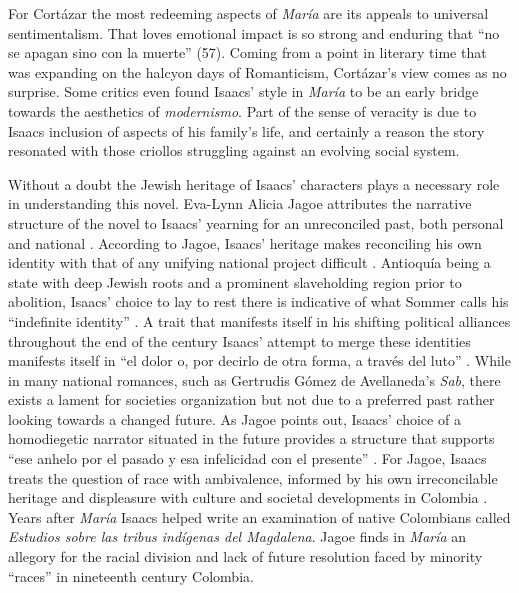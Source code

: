 For Cortázar the most redeeming aspects of \textit{María} are its appeals to universal sentimentalism. 
That loves emotional impact is so strong and enduring that \enquote{no se apagan sino con la muerte} (57). 
Coming from a point in literary time that was expanding on the halcyon days of Romanticism, Cortázar's view comes as no surprise. 
Some critics even found Isaacs' style in \textit{María} to be an early bridge towards the aesthetics of \textit{modernismo}.
Part of the sense of veracity is due to Isaacs inclusion of aspects of his family's life, and certainly a reason the story resonated with those criollos struggling against an evolving social system. 


Without a doubt the Jewish heritage of Isaacs' characters plays a necessary role in understanding this novel. 
Eva-Lynn Alicia Jagoe attributes the narrative structure of the novel to Isaacs' yearning for an unreconciled past, both personal and national \autocite[145]{Jagoe2003}.
According to Jagoe, Isaacs' heritage makes reconciling his own identity with that of any unifying national project difficult \autocite[145]{Jagoe2003}.
Antioquía being a state with deep Jewish roots and a prominent slaveholding region prior to abolition, Isaacs' choice to lay to rest there is indicative of what Sommer calls his \enquote{indefinite identity} \autocite[269]{Sommer1997}.
A trait that manifests itself in his shifting political alliances throughout the end of the century \autocite[270]{Sommer1997}
Isaacs' attempt to merge these identities manifests itself in \enquote{el dolor o, por decirlo de otra forma, a través del luto} \autocite[145]{Jagoe2003}.
While in many national romances, such as Gertrudis Gómez de Avellaneda's \textit{Sab}, there exists a lament for societies organization but not due to a preferred past rather looking towards a changed future.
As Jagoe points out, Isaacs' choice of a homodiegetic narrator situated in the future provides a structure that supports \enquote{ese anhelo por el pasado y esa infelicidad con el presente} \autocite[147]{Jagoe2003}.
For Jagoe, Isaacs treats the question of race with ambivalence, informed by his own irreconcilable heritage and displeasure with culture and societal developments in Colombia \autocite[158]{Jagoe2003}.
Years after \textit{María} Isaacs helped write an examination of native Colombians called \textit{Estudios sobre las tribus indígenas del Magdalena}.
Jagoe finds in \textit{María} an allegory for the racial division and lack of future resolution faced by minority \enquote{races} in nineteenth century Colombia.


